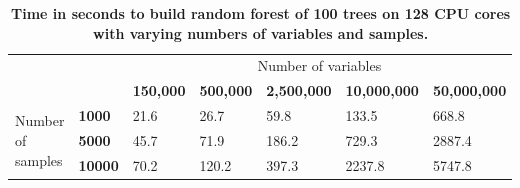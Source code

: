 \documentclass[10pt,a4paper]{article}  %
\begin{document}

\begin{table}[!ht]
\centering
\caption{
{\bf Time in seconds to build random forest of 100
  trees on 128 CPU cores with varying numbers of variables and samples.}}
\begin{tabular}{|l|l|l|l|l|l|l|}
\hline
\multicolumn{2}{|l|}{\multirow{2}{*}{}}               & \multicolumn{5}{c|}{Number of variables}  \\
\cline{3-7}
\multicolumn{2}{|l|}{}                                & \bf{150,000} & \bf{500,000} & \bf{2,500,000}  & \bf{10,000,000} & \bf{50,000,000} \\
\hline                                                            
\multirow{4}{*}{Number of samples}                          & \bf{1000} &  21.6 & 26.7 & 59.8 & 133.5 & 668.8 \\
                                                            & \bf{5000} & 45.7 & 71.9 & 186.2 & 729.3 & 2887.4 \\
                                                            & \bf{10000} & 70.2 & 120.2 & 397.3 & 2237.8 & 5747.8 \\
\hline
\end{tabular}
\begin{flushleft} 
\end{flushleft}
\label{table10}
\end{table}
\end{document}
